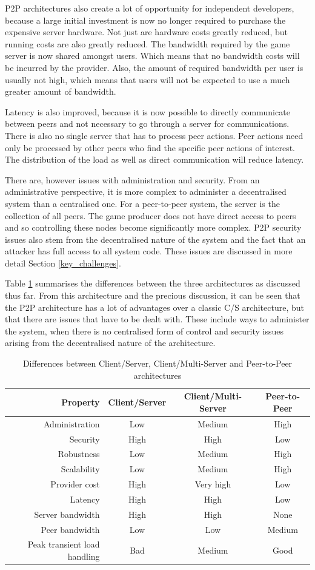 \documentclass[journal,oneside,a4paper,onecolumn]{IEEEtran}
\begin{document}
\ac{P2P} architectures also create a lot of opportunity for independent developers, because a large initial investment is now no longer required to purchase the expensive server hardware. Not just are hardware costs greatly reduced, but running costs are also greatly reduced. The bandwidth required by the game server is now shared amongst users. Which means that no bandwidth costs will be incurred by the provider. Also, the amount of required bandwidth per user is usually not high, which means that users will not be expected to use a much greater amount of bandwidth.

Latency is also improved, because it is now possible to directly communicate between peers and not necessary to go through a server for communications. There is also no single server that has to process peer actions. Peer actions need only be processed by other peers who find the specific peer actions of interest. The distribution of the load as well as direct communication will reduce latency.

There are, however issues with administration and security. From an administrative perspective, it is more complex to administer a decentralised system than a centralised one. For a peer-to-peer system, the server is the collection of all peers. The game producer does not have direct access to peers and so controlling these nodes become significantly more complex. P2P security issues also stem from the decentralised nature of the system and the fact that an attacker has full access to all system code. These issues are discussed in more detail Section \ref{key_challenges}.

Table \ref{tab_archs} summarises the differences between the three architectures as discussed thus far. From this architecture and the precious discussion, it can be seen that the P2P architecture has a lot of advantages over a classic C/S architecture, but that there are issues that have to be dealt with. These include ways to administer the system, when there is no centralised form of control and security issues arising from the decentralised nature of the architecture.
%
\begin{table}[htbp]
\centering
\begin{tabular}{|r|c|c|c|}
\hline
Property & Client/Server & Client/Multi-Server & Peer-to-Peer\\
\hline
Administration & Low & Medium & High\\
Security & High & High & Low\\
Robustness & Low & Medium & High\\
Scalability & Low & Medium & High\\
Provider cost & High & Very high & Low\\
Latency & High & High & Low\\
Server bandwidth & High & High & None\\
Peer bandwidth & Low & Low & Medium\\
Peak transient load handling & Bad & Medium & Good\\
\hline
\end{tabular}
\caption{Differences between Client/Server, Client/Multi-Server and Peer-to-Peer architectures}
\label{tab_archs}
\end{table}
\end{document}
